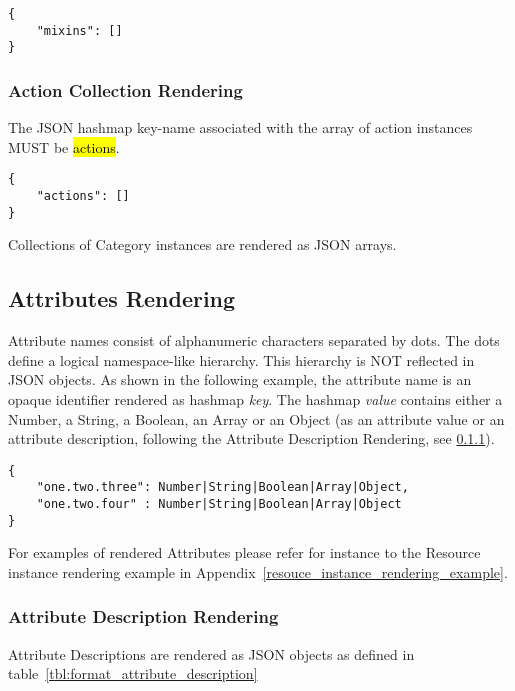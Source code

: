 \documentclass[10pt,a4paper]{article}
\begin{document}
\begin{lstlisting}
{
    "mixins": []
}
\end{lstlisting}

\subsubsection{Action Collection Rendering}

The JSON hashmap key-name associated with the array of action instances MUST be \hl{actions}.

\begin{lstlisting}
{
    "actions": []
}
\end{lstlisting}


Collections of Category instances are rendered as JSON arrays.

\subsection{Attributes Rendering}

Attribute names consist of alphanumeric characters separated by dots. The dots
define a logical namespace-like hierarchy. This hierarchy is NOT reflected in JSON
objects. As shown in the following example, the attribute name is an opaque
identifier rendered as hashmap \textit{key}. The hashmap \textit{value} contains either a
Number, a String, a Boolean, an Array or an Object (as an attribute value or an attribute
description, following the Attribute Description Rendering, see \ref{sec:format_attribute_description}).
\begin{lstlisting}
{
    "one.two.three": Number|String|Boolean|Array|Object,
    "one.two.four" : Number|String|Boolean|Array|Object
}
\end{lstlisting}

For examples of rendered Attributes please refer for instance to the Resource instance rendering example in Appendix~\ref{resouce_instance_rendering_example}.


\subsubsection{Attribute Description Rendering}
\label{sec:format_attribute_description}

Attribute Descriptions are rendered as JSON objects as defined in table~\ref{tbl:format_attribute_description}
\end{document}
